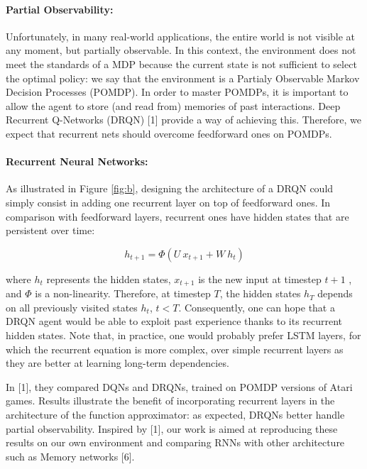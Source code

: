 \documentclass{article} %
\begin{document}
	\paragraph{Partial Observability:} Unfortunately, in many real-world applications, the entire world is not visible at any moment, but partially observable. In this context, the environment does not meet the standards of a MDP because the current state is not sufficient to select the optimal policy: we say that the environment is a Partialy Observable Markov Decision Processes (POMDP). In order to master POMDPs, it is important to allow the agent to store (and read from) memories of past interactions. Deep Recurrent Q-Networks (DRQN) [1] provide a way of achieving this. Therefore, we expect that recurrent nets should overcome feedforward ones on POMDPs.
	
	\paragraph{Recurrent Neural Networks:} As illustrated in Figure \ref{fig:b}, designing the architecture of a DRQN could simply consist in adding one recurrent layer on top of feedforward ones. In comparison with feedforward layers, recurrent ones have hidden states that are persistent over time:

	$$ h_{t+1} = \Phi(U \ x_{t+1}  +  W \ h_t) $$
	
	where  $h_t$  represents the hidden states,  $x_{t+1}$  is the new input at timestep  $t+1$ , and  $\Phi$  is a non-linearity. Therefore, at timestep $T$, the hidden states  $h_T$ depends on all previously visited states  $h_t$, $t<T$. Consequently, one can hope that a DRQN agent would be able to exploit past experience thanks to its recurrent hidden states. Note that, in practice, one would probably prefer LSTM layers, for which the recurrent equation is more complex, over simple recurrent layers as they are better at learning long-term dependencies.
	
	In [1], they compared DQNs and DRQNs, trained on POMDP versions of Atari games. Results illustrate the benefit of incorporating recurrent layers in the architecture of the function approximator: as expected, DRQNs better handle partial observability. Inspired by [1], our work is aimed at reproducing these results on our own environment and comparing RNNs with other architecture such as Memory networks [6].
	
\end{document}
